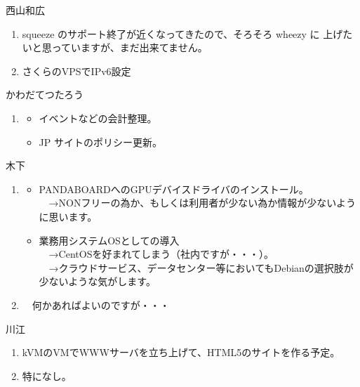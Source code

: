 \documentclass[mingoth,a4paper]{jsarticle}
\begin{document}
\begin{prework}{ 西山和広 }
  \begin{enumerate}
  \item squeeze のサポート終了が近くなってきたので、そろそろ wheezy に
    上げたいと思っていますが、まだ出来てません。
  \item さくらのVPSでIPv6設定
  \end{enumerate}
\end{prework}

\begin{prework}{ かわだてつたろう }
  \begin{enumerate}
  \item 
    \begin{itemize}
    \item イベントなどの会計整理。
    \item JP サイトのポリシー更新。
    \end{itemize}
  \end{enumerate}
\end{prework}

\begin{prework}{ 木下 }
  \begin{enumerate}
  \item 
    \begin{itemize}
    \item PANDABOARDへのGPUデバイスドライバのインストール。\\
      　→NONフリーの為か、もしくは利用者が少ない為か情報が少ないように思います。
    \item 業務用システムOSとしての導入\\
      　→CentOSを好まれてしまう（社内ですが・・・）。\\
      　→クラウドサービス、データセンター等においてもDebianの選択肢が少ないような気がします。

    \end{itemize}
  \item 
    　何かあればよいのですが・・・
  \end{enumerate}
\end{prework}

\begin{prework}{ 川江 }
  \begin{enumerate}
  \item kVMのVMでWWWサーバを立ち上げて、HTML5のサイトを作る予定。
  \item 特になし。
  \end{enumerate}
\end{prework}
\end{document}
